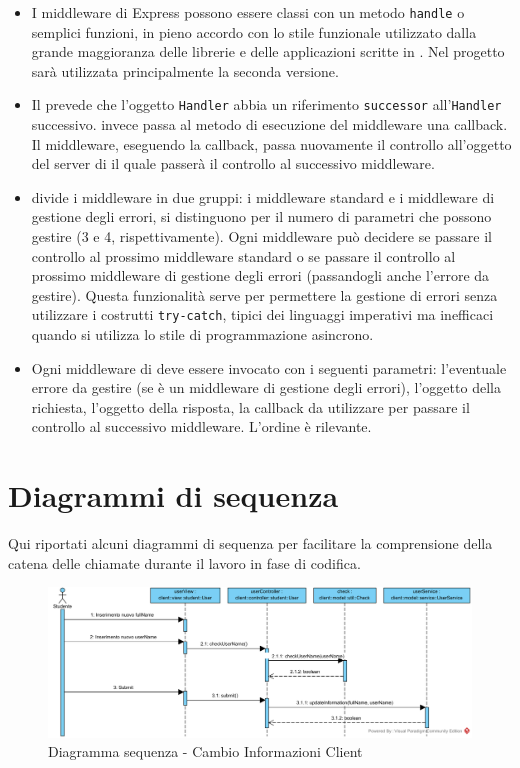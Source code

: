 \documentclass[12pt,a4paper]{article}
\begin{document}
\begin{itemize}
	\item I middleware di Express possono essere classi con un metodo \texttt{handle} o semplici funzioni, in pieno accordo con lo stile funzionale utilizzato dalla grande maggioranza delle librerie e delle applicazioni scritte in . Nel progetto sarà utilizzata principalmente la seconda versione.
	\item Il  prevede che l’oggetto \texttt{Handler} abbia un riferimento \texttt{successor} all’\texttt{Handler} successivo.  invece passa al metodo di esecuzione del middleware una callback. Il middleware, eseguendo la callback, passa nuovamente il controllo all’oggetto del server di  il quale passerà il controllo al successivo middleware.
	\item {} divide i middleware in due gruppi: i middleware standard e i middleware di gestione degli errori, si distinguono per il numero di parametri che possono gestire (3 e 4, rispettivamente). Ogni middleware può decidere se passare il controllo al prossimo middleware standard o se passare il controllo al prossimo middleware di gestione degli errori (passandogli anche l’errore da gestire). Questa funzionalità serve per permettere la gestione di errori senza utilizzare i costrutti \texttt{try-catch}, tipici dei linguaggi imperativi ma inefficaci quando si utilizza lo stile di programmazione asincrono.
	\item Ogni middleware di  deve essere invocato con i seguenti parametri: l’eventuale errore da gestire (se è un middleware di gestione degli errori), l’oggetto della richiesta, l’oggetto della risposta, la callback da utilizzare per passare il controllo al successivo middleware. L’ordine è rilevante.
\end{itemize}

\newpage


\section{Diagrammi di sequenza}
Qui riportati alcuni diagrammi di sequenza per facilitare la comprensione della catena delle chiamate durante il lavoro in fase di codifica.

\begin{center}
	\begin{figure}[H]
		\centering \includegraphics[max width=\myheighttwo, angle=90 ]{../img/diagrammiSequenza/cambioInfoClient.png}
		\caption{Diagramma sequenza - Cambio Informazioni Client}
	\end{figure}
\end{center}
\end{document}

